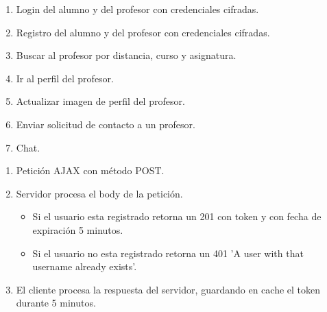 \documentclass[notes,slidesec,a4]{seminar}
\begin{document}

\begin{hslide}
\begin{enumerate}
\item Login del alumno y del profesor con credenciales cifradas.
\item Registro del alumno y del profesor con credenciales cifradas.
\item Buscar al profesor por distancia, curso y asignatura.
\item Ir al perfil del profesor.
\item Actualizar imagen de perfil del profesor.
\item Enviar solicitud de contacto a un profesor.
\item Chat.
\end{enumerate}
\end{hslide}


\begin{hslide}
\begin{enumerate}
\item Petición AJAX con método POST.
\item Servidor procesa el body de la petición.
\begin{itemize}
\item Si el usuario esta registrado retorna un 201 con token y con fecha de expiración 5 minutos.
\item Si el usuario no esta registrado retorna un 401 'A user with that username already exists'.
\end{itemize}
\item El cliente procesa la respuesta del servidor, guardando en cache el token durante 5 minutos.
\end{enumerate}
\end{hslide}

\end{document}

